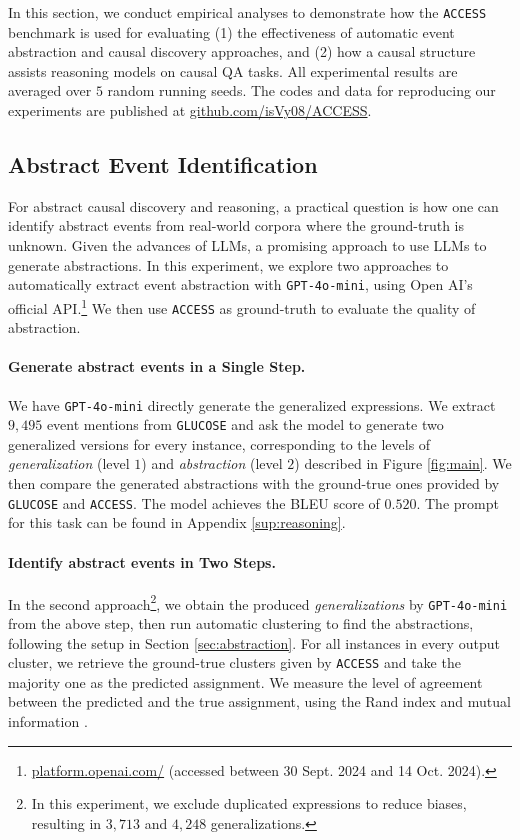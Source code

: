 In this section, we conduct empirical analyses to demonstrate how the \texttt{ACCESS} benchmark is used for evaluating (1) the effectiveness of automatic event abstraction and causal discovery approaches, and (2) how a causal structure assists reasoning models on causal QA tasks.  All experimental results are averaged over $5$ random running seeds. The codes and data for reproducing our experiments are published at \url{github.com/isVy08/ACCESS}. 

\subsection{Abstract Event Identification}\label{sec:abstraction_exp}For abstract causal discovery and reasoning, a practical question is how one can identify abstract events from real-world corpora where the ground-truth is unknown. 
Given the advances of LLMs, a promising approach to use LLMs to generate abstractions. In this experiment, we explore two approaches to automatically extract event abstraction with \texttt{GPT-4o-mini}, using Open AI's official API.\footnote{\url{platform.openai.com/} (accessed between 30 Sept. 2024 and 14 Oct. 2024).} We then use \texttt{ACCESS} as ground-truth to evaluate the quality of abstraction. 

\paragraph{Generate abstract events in a Single Step.}
We have \texttt{GPT-4o-mini} directly generate the generalized expressions. We extract $9,495$ event mentions from \texttt{GLUCOSE} and ask the model to generate two generalized versions for every instance, corresponding to the levels of \textit{generalization} (level $1$) and \textit{abstraction} (level $2$) described in Figure \ref{fig:main}. We then compare the generated abstractions with the ground-true ones provided by \texttt{GLUCOSE} and \texttt{ACCESS}. The model achieves the BLEU score of $0.520$. The prompt for this task can be found in Appendix \ref{sup:reasoning}.

\paragraph{Identify abstract events in Two Steps.}
In the second approach\footnote{In this experiment, we exclude duplicated expressions to reduce biases, resulting in $3,713$ and $4,248$ generalizations.}, we obtain the produced \textit{generalizations} by \texttt{GPT-4o-mini} from the above step, then run automatic clustering to find the abstractions, following the setup in Section \ref{sec:abstraction}. For all instances in every output cluster, we retrieve the ground-true clusters given by \texttt{ACCESS} and take the majority one as the predicted assignment. We measure the level of agreement between the predicted and the true assignment, using the Rand index \citep{steinley2004properties} and mutual information \citep{vinh2009information}. 

